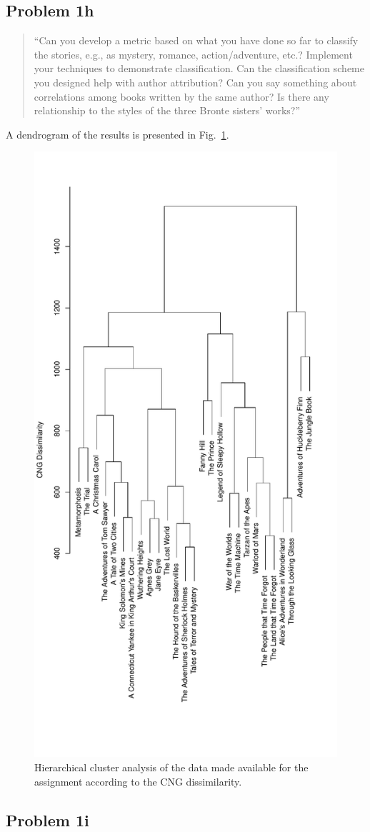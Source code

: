 \documentclass[conference]{IEEEtran}
\newcommand{\codefile}[1]{
  \begin{framed}
  \fontsize{5.65}{6.78}\selectfont
  
  \end{framed}
}
\begin{document}
\subsection{Problem 1h}
\label{sec:problem1h}

\begin{quote}
``Can you develop a metric based on what you have done so far to classify the stories, e.g., 
as mystery, romance, action/adventure, etc.? Implement your techniques to demonstrate 
classification. Can the classification scheme you designed help with author attribution? 
Can you say something about correlations among books written by the same author? 
Is there any relationship to the styles of the three Bronte sisters' works?''
\end{quote}

\codefile{problem1h.py}

A dendrogram of the results is presented in Fig.~\ref{fig:problem1h}.

\begin{figure}[!t]
\centering
\includegraphics[height=\textwidth,angle=270]{problem1h}
\caption{Hierarchical cluster analysis of the data made available for the assignment
according to the CNG dissimilarity.}
\label{fig:problem1h}
\end{figure}

\subsection{Problem 1i}
\label{sec:problem1i}
\end{document}
